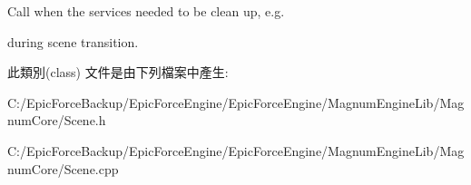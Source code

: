 Call when the services needed to be clean up, e.\+g. 

during scene transition. 

此類別(class) 文件是由下列檔案中產生\+:\begin{DoxyCompactItemize}
\item 
C\+:/\+Epic\+Force\+Backup/\+Epic\+Force\+Engine/\+Epic\+Force\+Engine/\+Magnum\+Engine\+Lib/\+Magnum\+Core/Scene.\+h\item 
C\+:/\+Epic\+Force\+Backup/\+Epic\+Force\+Engine/\+Epic\+Force\+Engine/\+Magnum\+Engine\+Lib/\+Magnum\+Core/Scene.\+cpp\end{DoxyCompactItemize}

